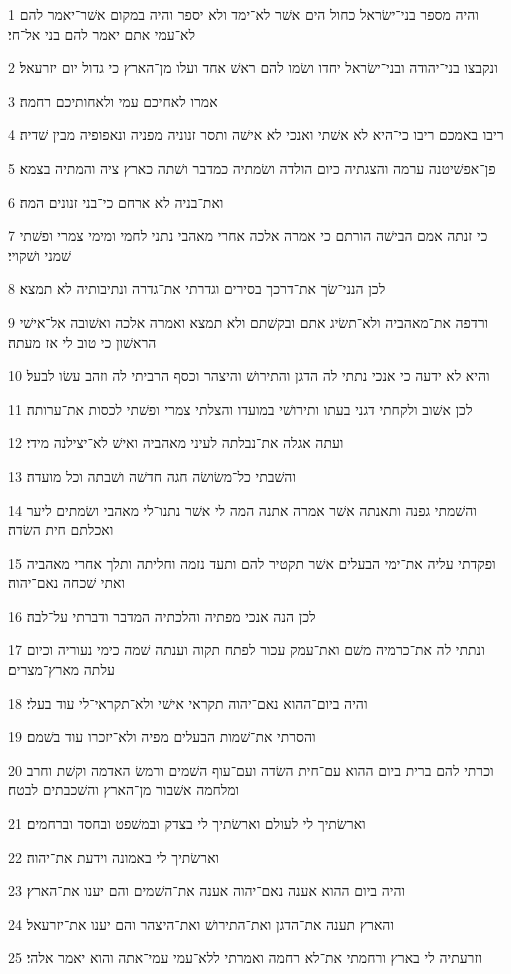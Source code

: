 \par 1 והיה מספר בני־ישׂראל כחול הים אשׁר לא־ימד ולא יספר והיה במקום אשׁר־יאמר להם לא־עמי אתם יאמר להם בני אל־חי׃
\par 2 ונקבצו בני־יהודה ובני־ישׂראל יחדו ושׂמו להם ראשׁ אחד ועלו מן־הארץ כי גדול יום יזרעאל׃
\par 3 אמרו לאחיכם עמי ולאחותיכם רחמה׃
\par 4 ריבו באמכם ריבו כי־היא לא אשׁתי ואנכי לא אישׁה ותסר זנוניה מפניה ונאפופיה מבין שׁדיה׃
\par 5 פן־אפשׁיטנה ערמה והצגתיה כיום הולדה ושׂמתיה כמדבר ושׁתה כארץ ציה והמתיה בצמא׃
\par 6 ואת־בניה לא ארחם כי־בני זנונים המה׃
\par 7 כי זנתה אמם הבישׁה הורתם כי אמרה אלכה אחרי מאהבי נתני לחמי ומימי צמרי ופשׁתי שׁמני ושׁקויי׃
\par 8 לכן הנני־שׂך את־דרכך בסירים וגדרתי את־גדרה ונתיבותיה לא תמצא׃
\par 9 ורדפה את־מאהביה ולא־תשׂיג אתם ובקשׁתם ולא תמצא ואמרה אלכה ואשׁובה אל־אישׁי הראשׁון כי טוב לי אז מעתה׃
\par 10 והיא לא ידעה כי אנכי נתתי לה הדגן והתירושׁ והיצהר וכסף הרביתי לה וזהב עשׂו לבעל׃
\par 11 לכן אשׁוב ולקחתי דגני בעתו ותירושׁי במועדו והצלתי צמרי ופשׁתי לכסות את־ערותה׃
\par 12 ועתה אגלה את־נבלתה לעיני מאהביה ואישׁ לא־יצילנה מידי׃
\par 13 והשׁבתי כל־משׂושׂה חגה חדשׁה ושׁבתה וכל מועדה׃
\par 14 והשׁמתי גפנה ותאנתה אשׁר אמרה אתנה המה לי אשׁר נתנו־לי מאהבי ושׂמתים ליער ואכלתם חית השׂדה׃
\par 15 ופקדתי עליה את־ימי הבעלים אשׁר תקטיר להם ותעד נזמה וחליתה ותלך אחרי מאהביה ואתי שׁכחה נאם־יהוה׃
\par 16 לכן הנה אנכי מפתיה והלכתיה המדבר ודברתי על־לבה׃
\par 17 ונתתי לה את־כרמיה משׁם ואת־עמק עכור לפתח תקוה וענתה שׁמה כימי נעוריה וכיום עלתה מארץ־מצרים׃
\par 18 והיה ביום־ההוא נאם־יהוה תקראי אישׁי ולא־תקראי־לי עוד בעלי׃
\par 19 והסרתי את־שׁמות הבעלים מפיה ולא־יזכרו עוד בשׁמם׃
\par 20 וכרתי להם ברית ביום ההוא עם־חית השׂדה ועם־עוף השׁמים ורמשׂ האדמה וקשׁת וחרב ומלחמה אשׁבור מן־הארץ והשׁכבתים לבטח׃
\par 21 וארשׂתיך לי לעולם וארשׂתיך לי בצדק ובמשׁפט ובחסד וברחמים׃
\par 22 וארשׂתיך לי באמונה וידעת את־יהוה׃
\par 23 והיה ביום ההוא אענה נאם־יהוה אענה את־השׁמים והם יענו את־הארץ׃
\par 24 והארץ תענה את־הדגן ואת־התירושׁ ואת־היצהר והם יענו את־יזרעאל׃
\par 25 וזרעתיה לי בארץ ורחמתי את־לא רחמה ואמרתי ללא־עמי עמי־אתה והוא יאמר אלהי׃


